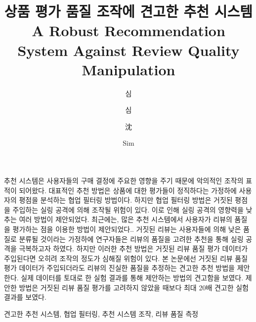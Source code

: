 \documentclass[master,english,final]{kaist-ucs}
\title[korean] {상품 평가 품질 조작에 견고한 추천 시스템}
\title[english]{A Robust Recommendation System \linebreak Against Review Quality Manipulation}
\author[korean] {심}{동 진}
\author[korean2] {심}{동진}    %
\author[chinese]{沈}{東 鎭}
\author[english]{Sim}{Dongjin}
\begin{document}

   \thesisinfo
    \begin{summary}
    추천 시스템은 사용자들의 구매 결정에 주요한 영향을 주기 때문에 악의적인 조작의 표적이 되어왔다.
    대표적인 추천 방법은 상품에 대한 평가들이 정직하다는 가정하에 사용자의 평점을 분석하는 협업 필터링 방법이다.
    하지만 협업 필터링 방법은 거짓된 평점을 주입하는 실링 공격에 의해 조작될 위험이 있다.
    이로 인해 실링 공격의 영향력을 낮추는 여러 방법이 제안되었다.
    최근에는, 많은 추천 시스템에서 사용자가 리뷰의 품질을 평가하는 점을 이용한 방법이 제안되었다..
    거짓된 리뷰는 사용자들에 의해 낮은 품질로 분류될 것이라는 가정하에 연구자들은 리뷰의 품질을 고려한 추천을 통해 실링 공격을 극복하고자 하였다.
    하지만 이러한 추천 방법은 거짓된 리뷰 품질 평가 데이터가 주입된다면 오히려 조작의 정도가 심해질 위험이 있다.
    본 논문에선 거짓된 리뷰 품질 평가 데이터가 주입되더라도 리뷰의 진실한 품질을 추정하는 견고한 추천 방법을 제안한다.
    실제 데이터를 토대로 한 실험 결과를 통해 제안하는 방법의 견고함을 보였다.
    제안한 방법은 거짓된 리뷰 품질 평가를 고려하지 않았을 때보다 최대 20배 견고한 실험 결과를 보였다.
    \end{summary}

    \begin{Korkeyword}
    견고한 추천 시스템, 협업 필터링, 추천 시스템 조작, 리뷰 품질 측정
    \end{Korkeyword}
\end{document}
